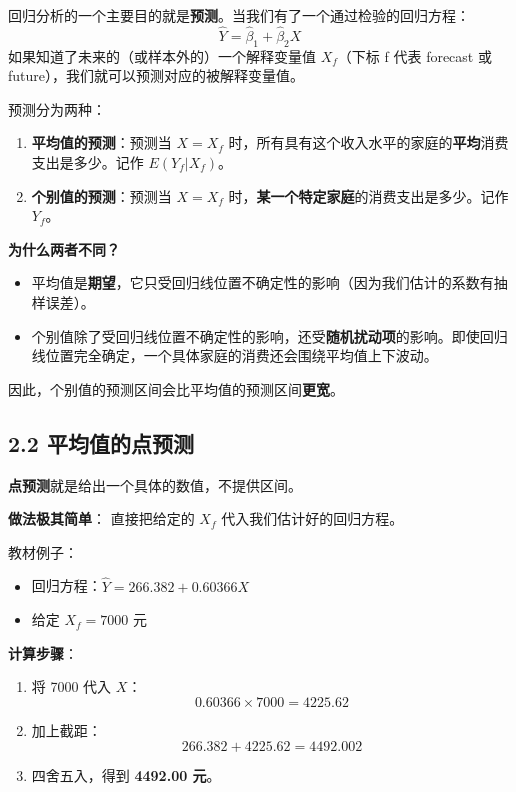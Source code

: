 \documentclass[12pt,a4paper]{article}
\begin{document}
回归分析的一个主要目的就是\textbf{预测}。当我们有了一个通过检验的回归方程：
\[
\hat{Y} = \hat{\beta}_1 + \hat{\beta}_2 X
\]
如果知道了未来的（或样本外的）一个解释变量值 \(X_f\)（下标 f 代表 forecast 或 future），我们就可以预测对应的被解释变量值。

预测分为两种：

\begin{enumerate}
\item \textbf{平均值的预测}：预测当 \(X = X_f\) 时，所有具有这个收入水平的家庭的\textbf{平均}消费支出是多少。记作 \(E(Y_f|X_f)\)。

\item \textbf{个别值的预测}：预测当 \(X = X_f\) 时，\textbf{某一个特定家庭}的消费支出是多少。记作 \(Y_f\)。
\end{enumerate}

\textbf{为什么两者不同？}

\begin{itemize}
\item 平均值是\textbf{期望}，它只受回归线位置不确定性的影响（因为我们估计的系数有抽样误差）。
\item 个别值除了受回归线位置不确定性的影响，还受\textbf{随机扰动项}的影响。即使回归线位置完全确定，一个具体家庭的消费还会围绕平均值上下波动。
\end{itemize}

因此，个别值的预测区间会比平均值的预测区间\textbf{更宽}。

\subsection*{2.2 平均值的点预测}

\textbf{点预测}就是给出一个具体的数值，不提供区间。

\textbf{做法极其简单}：
直接把给定的 \(X_f\) 代入我们估计好的回归方程。

教材例子：
\begin{itemize}
\item 回归方程：\(\hat{Y} = 266.382 + 0.60366 X\)
\item 给定 \(X_f = 7000\) 元
\end{itemize}

\textbf{计算步骤}：
\begin{enumerate}
\item 将 7000 代入 \(X\)：
   \[
   0.60366 \times 7000 = 4225.62
   \]
\item 加上截距：
   \[
   266.382 + 4225.62 = 4492.002
   \]
\item 四舍五入，得到 \textbf{4492.00 元}。
\end{enumerate}
\end{document}
